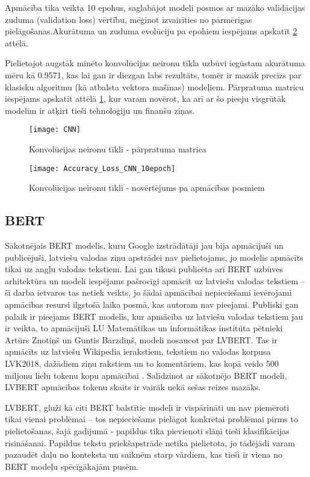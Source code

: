 Apmācība tika veikta 10 epohus, saglabājot modeli posmos ar mazāko validācijas zuduma (validation loss) vērtību, mēģinot izvairīties no pārmērīgas pielāgošanas.Akurātuma un zuduma evolūciju pa epohiem iespējams apskatīt \ref{fig:Accuracy_Loss_CNN_10epoch} attēlā.

Pielietojot augstāk minēto konvolūcijas neironu tīkla uzbūvi iegūstam akurātuma mēru kā 0.9571, kas lai gan ir diezgan labs rezultāts, tomēr ir mazāk precīzs par klasisku algoritmu (kā atbalsta vektora mašīnas) modeļiem. Pārpratuma matricu iespējams apskatīt attēlā \ref{fig:CNN}, kur varam novērot, ka arī ar šo pieeju visgrūtāk modelim ir atķirt tieši tehnoloģiju un finanšu ziņas.

\begin{figure}[H]
	\centering
	\texttt{[image: CNN]}
	\caption{Konvolūcijas neironu tīkli - pārpratuma matrica}
	\label{fig:CNN}
\end{figure}

\begin{figure}[H]
	\texttt{[image: Accuracy\_Loss\_CNN\_10epoch]}
	\caption{Konvolūcijas neironu tīkli - novērtējums pa apmācības posmiem}
	\label{fig:Accuracy_Loss_CNN_10epoch}
\end{figure}

\subsection{BERT}
Sākotnējais BERT modelis, kuru Google izstrādātāji jau bija apmācījuši un publicējuši, latviešu valodas ziņu apstrādei nav pielietojams, jo modelis apmācīts tikai uz angļu valodas tekstiem. Lai gan tikusi publicēta arī BERT uzbūves arhitektūra un modeli iespējams pašrocīgi apmācīt uz latviešu valodas tekstiem – šī darba ietvaros tas netiek veikts, jo šādai apmācībai nepieciešami ievērojami apmācības resursi ilgstošā laika posmā, kas autoram nav pieejami. Publiski gan palaik ir pieejams BERT modelis, kur apmācība uz latviešu valodas tekstiem jau ir veikta, to apmācījuši LU Matemātikas un informātikas institūta pētnieki Artūrs Znotiņš un Guntis Barzdiņš, modeli nosaucot par LVBERT. Tas ir apmācīts uz latviešu Wikipedia ierakstiem, tekstiem no valodas korpusa LVK2018, dažādiem ziņu rakstiem un to komentāriem, kas kopā veido 500 miljonu lielu tokenu kopu apmācībai \cite{lvbert}. Salīdzinot ar sākotnējo BERT modeli, LVBERT apmācības tokenu skaits ir vairāk nekā sešas reizes mazāks.

LVBERT, gluži kā citi BERT balstītie modeļi ir vispārināti un nav piemēroti tikai vienai problēmai – tos nepieciešams pielāgot konkrētai problēmai pirms to pielietošanas, šajā gadījumā - papildus tika pievienoti slāņi tieši klasifikācijas risināšanai. Papildus tekstu priekšapstrāde netika pielietota, jo tādējādi varam pazaudēt daļu no konteksta un saiknēm starp vārdiem, kas tieši ir viena no BERT modeļu spēcīgākajām pusēm.

